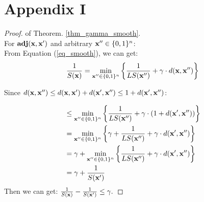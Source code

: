 \documentclass{article}
\begin{document}
\newpage
\section*{Appendix I}
\label{app_sensitivity}
\begin{proof}
of Theorem. \ref{thm_gamma_smooth}.\\
For $\textbf{adj}(\textbf{x},\textbf{x}')$ and arbitrary $\textbf{x}'' \in \{0,1\}^{n}$:\\
From Equation (\ref{eq_smooth}), we can get:
\[
\frac{1}{S(\textbf{x})} 
 = \min_{\textbf{x}'' \in \{0,1\}^{n}}\bigg \{ \frac{1}{LS(\textbf{x}'')} +\gamma \cdot d(\textbf{x},\textbf{x}'') \bigg \}\\
\]

Since $d(\textbf{x},\textbf{x}'') \leq d(\textbf{x},\textbf{x}') + d(\textbf{x}',\textbf{x}'') \leq 1 + d(\textbf{x}',\textbf{x}'')$:

\begin{equation*}
\begin{split}
& \leq \min_{\textbf{x}'' \in \{0,1\}^{n}}\bigg \{  \frac{1}{LS(\textbf{x}'')} +\gamma \cdot (1 + d(\textbf{x}',\textbf{x}'')) \bigg \}\\
& = \min_{\textbf{x}'' \in \{0,1\}^{n}}\bigg \{
\gamma + \frac{1}{LS(\textbf{x}'')} +\gamma \cdot d(\textbf{x}',\textbf{x}'')\bigg 
\}\\
& = \gamma + \min_{\textbf{x}'' \in \{0,1\}^{n}}\bigg \{
\frac{1}{LS(\textbf{x}'')} +\gamma \cdot d(\textbf{x}',\textbf{x}'')\bigg
\}\\
& = \gamma + \frac{1}{S(\textbf{x}')}
\end{split}
\end{equation*}
Then we can get:
$\frac{1}{S(\textbf{x})} - \frac{1}{S(\textbf{x}')} \leq \gamma.$
\end{proof}
\end{document}

